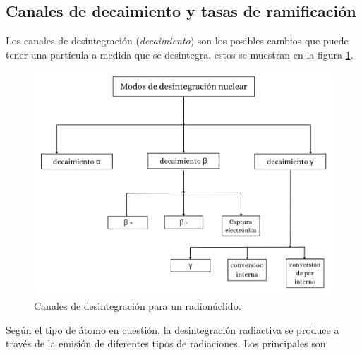 \subsection{Canales de decaimiento y tasas de ramificación}

\noindent Los canales de desintegración (\textit{decaimiento}) son los posibles cambios que puede tener una partícula a medida que se desintegra, estos se muestran en la figura \ref{channels}.

\begin{figure}%
    \begin{center}
        \includegraphics[scale=0.5]{imagenes/decay.png}
        \caption{Canales de desintegración para un radionúclido.}\label{channels}
    \end{center}
\end{figure}

\noindent Según el tipo de átomo en cuestión, la desintegración radiactiva se produce a través de la emisión de diferentes tipos de radiaciones. Los principales son: 

